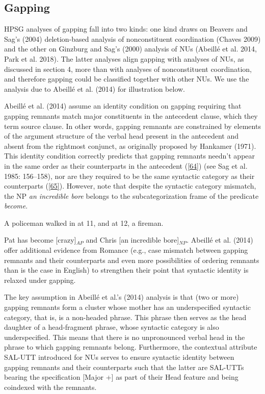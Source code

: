 \documentclass[output=paper
                ,modfonts
                ,nonflat
	        ,collection
	        ,collectionchapter
	        ,collectiontoclongg
 	        ,biblatex
                ,babelshorthands
                ,newtxmath
                ,draftmode
                ,colorlinks, citecolor=brown
]{./langsci/langscibook}
\begin{document}
{\subsection{Gapping}
HPSG analyses of gapping fall into two kinds: one kind draws on Beavers and Sag's (2004) deletion-based analysis of nonconstituent coordination (Chaves 2009) and the other on Ginzburg and Sag's (2000) analysis of NUs (Abeill\'{e} et al. 2014, Park et al. 2018). The latter analyses align gapping with analyses of NUs, as discussed in section 4, more than with analyses of nonconstituent coordination, and therefore gapping could be classified together with other NUs. We use the analysis due to Abeill\'{e} et al. (2014) for illustration below.

Abeill\'{e} et al. (2014) assume an identity condition on gapping requiring that gapping remnants match major constituents in the antecedent clause, which they term source clause. In other words, gapping remnants are constrained by elements of the argument structure of the verbal head present in the antecedent and absent from the rightmost conjunct, as originally proposed by Hankamer (1971). This identity condition correctly predicts that gapping remnants needn't appear in the same order as their counterparts in the antecedent (\ref{64}) (see Sag et al. 1985: 156--158), nor are they required to be the same syntactic category as their counterparts (\ref{65}). However, note that despite the syntactic category mismatch, the NP {\it an incredible bore} belongs to the subcategorization frame of the predicate {\it become}.

\ea A policeman walked in at 11, and at 12, a fireman. \label{64}\z

 \ea Pat has become [crazy]$_{AP}$ and Chris [an incredible bore]$_{NP}$.  \label{65}\z
Abeill\'{e} et al. (2014) offer additional evidence from Romance (e.g., case mismatch between gapping remnants and their counterparts and even more possibilities of ordering remnants than is the case in English) to strengthen their point that syntactic identity is relaxed under gapping.


The key assumption in Abeill\'{e} et al.'s (2014) analysis is that (two or more) gapping remnants form a cluster whose mother has an underspecified syntactic category, that is, is a non-headed phrase. This phrase then serves as the head daughter of a head-fragment phrase, whose syntactic category is also underspecified. This means that there is no unpronounced verbal head in the phrase to which gapping remnants belong. Furthermore, the contextual attribute SAL-UTT introduced for NUs serves to ensure syntactic identity between gapping remnants and their counterparts such that the latter are SAL-UTTs bearing the specification [Major +] as part of their Head feature and being coindexed with the remnants.

}
\end{document}
